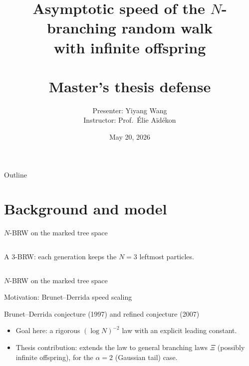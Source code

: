\documentclass[10pt, aspectratio=169]{beamer}
\title[Asymptotic speed of $N$-BRW]{Asymptotic speed of the $N$-branching random walk\\with infinite offspring\\[6pt] \cnkai{可无限分支的 $N$-分支随机游走的渐近速率性质}\\[6pt] \small Master's thesis defense}
\author[Wang Yiyang]{Presenter: Yiyang Wang \\ \small Instructor: Prof.~Élie Aïdékon}
\institute[Fudan University]{School of Mathematical Sciences, Fudan University}
\date{May 20, 2026}
\begin{document}
\begin{frame}
    \titlepage
\end{frame}

\begin{frame}{Outline}
    \tableofcontents
\end{frame}

\section{Background and model}

\begin{frame}{$N$-BRW on the marked tree space}
    \begin{columns}[T]
            \centering
            
            \vspace{1mm}

            \footnotesize A 3-BRW: each generation keeps the $N=3$ leftmost particles.
            \small
            
    \end{columns}
\end{frame}

\begin{frame}{$N$-BRW on the marked tree space}
    \small
    
\end{frame}

\begin{frame}{Motivation: Brunet--Derrida speed scaling}
    \begin{block}{Brunet--Derrida conjecture (1997) and refined conjecture (2007)}
        
    \end{block}
    \vspace{-1mm}
    \begin{itemize}
        \item Goal here: a rigorous $(\log N)^{-2}$ law with an explicit leading constant.
        \item Thesis contribution: extends the law to general branching laws $\Xi$ (possibly infinite offspring), for the $\alpha=2$ (Gaussian tail) case.
    \end{itemize}
\end{frame}
\end{document}
